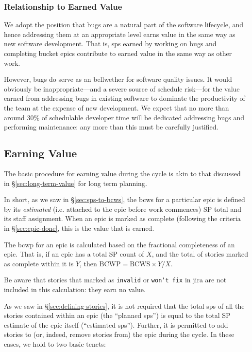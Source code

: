 \subsubsection{Relationship to Earned
Value}\label{relationship-to-earned-value}

We adopt the position that bugs are a natural part of the software
lifecycle, and hence addressing them at an appropriate level earns value
in the same way as new software development. That is, \glspl{sp} earned by
working on bugs and completing bucket \glspl{epic} contribute to earned value
in the same way as other work.

However, bugs do serve as an bellwether for software quality issues.
It would obviously be inappropriate---and a severe source of schedule \gls{risk}---for the value earned from addressing bugs in existing software to dominate the productivity of the team at the expense of new development.
We expect that no more than around 30\% of schedulable developer time will be dedicated addressing bugs and performing maintenance: any more than this must be carefully justified.

\subsection{Earning Value}
\label{sec:cycle-value}

The basic procedure for earning value during the \gls{cycle} is akin to that discussed in \S\ref{sec:long-term-value} for long term planning.

In short, as we saw in \S\ref{sec:sps-to-bcws}, the \gls{bcws} for a particular \gls{epic} is defined by its \emph{estimated} (i.e.  attached to the \gls{epic} before work commences) SP total and its staff assignment.
When an \gls{epic} is marked as complete (following the criteria in \S\ref{sec:epic-done}, this is the value that is earned.

The \gls{bcwp} for an \gls{epic} is calculated based on the fractional completeness of an \gls{epic}. That is, if an \gls{epic} has a total SP count of \(X\), and the total of stories marked as complete within it is \(Y\), then \(\mathrm{BCWP} = \mathrm{BCWS} \times Y / X\).

Be aware that stories that marked as \texttt{invalid} or \texttt{won't fix} in \gls{jira} are not included in this calculation: they earn no value.

As we saw in \S\ref{sec:defining-stories}, it is not required that the total \glspl{sp} of all the stories contained within an \gls{epic} (the ``planned \glspl{sp}'') is equal to the total SP estimate of the \gls{epic} itself (``estimated \glspl{sp}''). Further, it is permitted to add stories to (or, indeed, remove stories from) the \gls{epic} during the \gls{cycle}. In these cases, we hold to two basic tenets:

